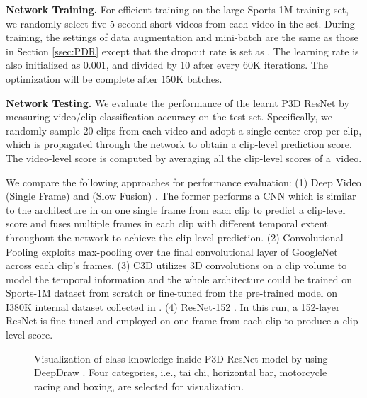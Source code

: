 \documentclass[10pt,twocolumn,letterpaper]{article}
\begin{document}
\textbf{Network Training.} For efficient training on the large Sports-1M training set, we randomly select five 5-second short videos from each video in the set. During training, the settings of data augmentation and mini-batch are the same as those in Section \ref{ssec:PDR} except that the dropout rate is set as . The learning rate is also initialized as 0.001, and divided by 10 after every 60K iterations. The optimization will be complete after 150K batches.

\textbf{Network Testing.} We evaluate the performance of the learnt P3D ResNet by measuring video/clip classification accuracy on the test set. Specifically, we randomly sample 20 clips from each video and adopt a single center crop per clip, which is propagated through the network to obtain a clip-level prediction score. The video-level score is computed by averaging all the clip-level scores of a~video.

We compare the following approaches for performance evaluation: (1) Deep Video (Single Frame) and (Slow Fusion) \cite{karpathy2014large}. The former performs a CNN which is similar to the architecture in \cite{krizhevsky2012imagenet} on one single frame from each clip to predict a clip-level score and fuses multiple frames in each clip with different temporal extent throughout the network to achieve the clip-level prediction. (2) Convolutional Pooling \cite{yue2015beyond} exploits max-pooling over the final convolutional layer of GoogleNet \cite{szegedy2015going} across each clip's frames. (3) C3D \cite{tran2015learning} utilizes 3D convolutions on a clip volume to model the temporal information and the whole architecture could be trained on Sports-1M dataset from scratch or fine-tuned from the pre-trained model on I380K internal dataset collected in \cite{tran2015learning}. (4) ResNet-152 \cite{he2015deep}. In this run, a 152-layer ResNet is fine-tuned and employed on one frame from each clip to produce a clip-level score.


\begin{figure*}[!tb]
   \caption{\small Visualization of class knowledge inside P3D ResNet model by using DeepDraw \cite{deepdraw}. Four categories, i.e., tai chi, horizontal bar, motorcycle racing and boxing, are selected for visualization.}
   \label{fig:fig4}
   \vspace{-0.18in}
\end{figure*}
\end{document}

